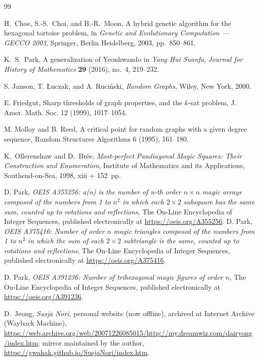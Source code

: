 \documentclass[11pt]{article}
\theoremstyle{plain}
\theoremstyle{definition}
\begin{document}
\begin{thebibliography}{99}

H.~Choe, S.-S.~Choi, and B.-R.~Moon,
A hybrid genetic algorithm for the hexagonal tortoise problem,
in \emph{Genetic and Evolutionary Computation --- GECCO 2003},
Springer, Berlin Heidelberg, 2003, pp.~850--861.


K.~S.~Park,
A generalization of Yeonhwando in \emph{Yang Hui Suanfa},
\emph{Journal for History of Mathematics} \textbf{29} (2016), no.~4, 219--232.


S. Janson, T. Łuczak, and A. Ruciński,
\emph{Random Graphs},
Wiley, New York, 2000.

E. Friedgut,
Sharp thresholds of graph properties, and the $k$-sat problem,
J. Amer. Math. Soc. 12 (1999), 1017--1054.

M. Molloy and B. Reed,
A critical point for random graphs with a given degree sequence,
Random Structures Algorithms 6 (1995), 161--180.


K.~Ollerenshaw and D.~Brée,
\emph{Most-perfect Pandiagonal Magic Squares: Their Construction and Enumeration},
Institute of Mathematics and its Applications, Southend-on-Sea, 1998, xiii + 152~pp.

D. Park, \emph{OEIS A355256: a(n) is the number of n-th order $n \times n$ magic arrays composed of the numbers from 1 to $n^2$ in which each $2 \times 2$ subsquare has the same sum, counted up to rotations and reflections}, The On-Line Encyclopedia of Integer Sequences, published electronically at \url{https://oeis.org/A355256}. 
D. Park, \emph{OEIS A375416: Number of order $n$ magic triangles composed of the numbers from 1 to $n^2$ in which the sum of each $2 \times 2$ subtriangle is the same, counted up to rotations and reflections}, The On-Line Encyclopedia of Integer Sequences, published electronically at \url{https://oeis.org/A375416}. 


 D. Park, \emph{OEIS A391236: Number of trihexagonal magic figures of order $n$}, The On-Line Encyclopedia of Integer Sequences, published electronically at \url{https://oeis.org/A391236}.

D.~Jeong,
\textit{Susja Nori},
personal website (now offline),
archived at Internet Archive (Wayback Machine),
\url{https://web.archive.org/web/20071226085015/http://my.dreamwiz.com/dairyong/index.htm};
mirror maintained by the author,
\url{https://gwahak.github.io/SusjaNori/index.htm}.


\end{thebibliography}
\end{document}

